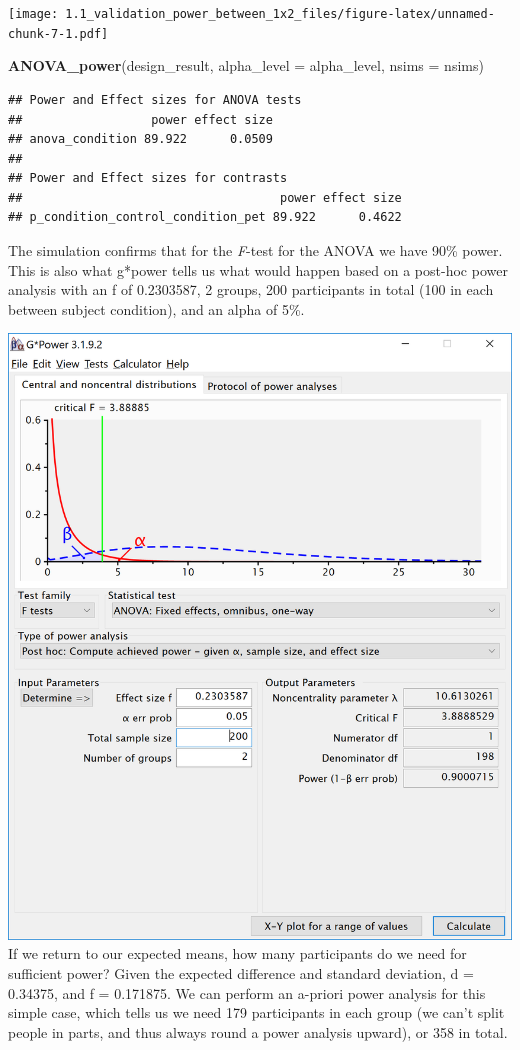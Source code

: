 \documentclass[]{article}
\newenvironment{Shaded}{\begin{snugshade}}{\end{snugshade}}
\newcommand{\KeywordTok}[1]{\textcolor[rgb]{0.13,0.29,0.53}{\textbf{#1}}}
\newcommand{\DataTypeTok}[1]{\textcolor[rgb]{0.13,0.29,0.53}{#1}}
\newcommand{\NormalTok}[1]{#1}
\begin{document}
\texttt{[image: 1.1\_validation\_power\_between\_1x2\_files/figure-latex/unnamed-chunk-7-1.pdf]}

\begin{Shaded}
\begin{Highlighting}[]
\KeywordTok{ANOVA_power}\NormalTok{(design_result, }\DataTypeTok{alpha_level =}\NormalTok{ alpha_level, }\DataTypeTok{nsims =}\NormalTok{ nsims)}
\end{Highlighting}
\end{Shaded}

\begin{verbatim}
## Power and Effect sizes for ANOVA tests
##                  power effect size
## anova_condition 89.922      0.0509
## 
## Power and Effect sizes for contrasts
##                                    power effect size
## p_condition_control_condition_pet 89.922      0.4622
\end{verbatim}

The simulation confirms that for the \emph{F}-test for the ANOVA we have
90\% power. This is also what g*power tells us what would happen based
on a post-hoc power analysis with an f of 0.2303587, 2 groups, 200
participants in total (100 in each between subject condition), and an
alpha of 5\%.

\includegraphics{screenshots/gpower_8.png} If we return to our expected
means, how many participants do we need for sufficient power? Given the
expected difference and standard deviation, d = 0.34375, and f =
0.171875. We can perform an a-priori power analysis for this simple
case, which tells us we need 179 participants in each group (we can't
split people in parts, and thus always round a power analysis upward),
or 358 in total.
\end{document}
